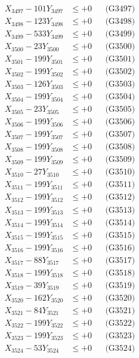 \documentclass[a4paper,10pt]{article}
\begin{document}
{\begin{align}
X_{3497} - 101Y_{3497} &\leq +0 && \text{(G3497)} \\
X_{3498} - 123Y_{3498} &\leq +0 && \text{(G3498)} \\
X_{3499} - 533Y_{3499} &\leq +0 && \text{(G3499)} \\
X_{3500} - 23Y_{3500} &\leq +0 && \text{(G3500)} \\
\allowbreak
X_{3501} - 199Y_{3501} &\leq +0 && \text{(G3501)} \\
X_{3502} - 199Y_{3502} &\leq +0 && \text{(G3502)} \\
X_{3503} - 126Y_{3503} &\leq +0 && \text{(G3503)} \\
X_{3504} - 199Y_{3504} &\leq +0 && \text{(G3504)} \\
X_{3505} - 23Y_{3505} &\leq +0 && \text{(G3505)} \\
X_{3506} - 199Y_{3506} &\leq +0 && \text{(G3506)} \\
X_{3507} - 199Y_{3507} &\leq +0 && \text{(G3507)} \\
X_{3508} - 199Y_{3508} &\leq +0 && \text{(G3508)} \\
X_{3509} - 199Y_{3509} &\leq +0 && \text{(G3509)} \\
X_{3510} - 27Y_{3510} &\leq +0 && \text{(G3510)} \\
\allowbreak
X_{3511} - 199Y_{3511} &\leq +0 && \text{(G3511)} \\
X_{3512} - 199Y_{3512} &\leq +0 && \text{(G3512)} \\
X_{3513} - 199Y_{3513} &\leq +0 && \text{(G3513)} \\
X_{3514} - 199Y_{3514} &\leq +0 && \text{(G3514)} \\
X_{3515} - 199Y_{3515} &\leq +0 && \text{(G3515)} \\
X_{3516} - 199Y_{3516} &\leq +0 && \text{(G3516)} \\
X_{3517} - 88Y_{3517} &\leq +0 && \text{(G3517)} \\
X_{3518} - 199Y_{3518} &\leq +0 && \text{(G3518)} \\
X_{3519} - 39Y_{3519} &\leq +0 && \text{(G3519)} \\
X_{3520} - 162Y_{3520} &\leq +0 && \text{(G3520)} \\
\allowbreak
X_{3521} - 84Y_{3521} &\leq +0 && \text{(G3521)} \\
X_{3522} - 199Y_{3522} &\leq +0 && \text{(G3522)} \\
X_{3523} - 199Y_{3523} &\leq +0 && \text{(G3523)} \\
X_{3524} - 53Y_{3524} &\leq +0 && \text{(G3524)} \\

\end{align}}
\end{document}

